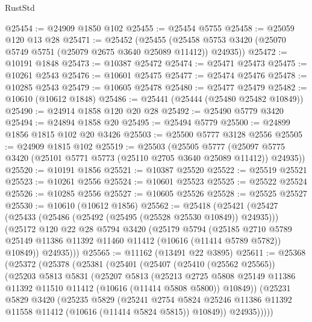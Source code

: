 \begin{lexlean}{RustStd}
\begin{coremodule}
@25454 := @24909 @1850 @102
@25455 := @25454 @5755
@25458 := @25059 @120 @13 @28
@25471 := @25452
    (@25455 (@25458 @5753 @3420 (@25070 @5749 @5751 (@25079 @2675 @3640 @25089 @11412)) @24935))
@25472 := @10191 @1848
@25473 := @10387 @25472
@25474 := @25471 @25473
@25475 := @10261 @2543
@25476 := @10601 @25475
@25477 := @25474 @25476
@25478 := @10285 @2543
@25479 := @10605 @25478
@25480 := @25477 @25479
@25482 := @10610 (@10612 @1848)
@25486 := @25441 (@25444 (@25480 @25482 @10849))
@25490 := @24914 @1858 @120 @20 @28
@25492 := @25490 @5779 @3420
@25494 := @24894 @1858 @20
@25495 := @25494 @5779
@25500 := @24899 @1856 @1815 @102 @20 @3426
@25503 := @25500 @5777 @3128 @2556
@25505 := @24909 @1815 @102
@25519 := @25503
    (@25505
      @5777
      (@25097 @5775 @3420 (@25101 @5771 @5773 (@25110 @2705 @3640 @25089 @11412)) @24935))
@25520 := @10191 @1856
@25521 := @10387 @25520
@25522 := @25519 @25521
@25523 := @10261 @2556
@25524 := @10601 @25523
@25525 := @25522 @25524
@25526 := @10285 @2556
@25527 := @10605 @25526
@25528 := @25525 @25527
@25530 := @10610 (@10612 @1856)
@25562 := @25418
    (@25421
      (@25427
        (@25433 (@25486 (@25492 (@25495 (@25528 @25530 @10849)) @24935)))
        (@25172
          @120
          @22
          @28
          @5794
          @3420
          (@25179
            @5794
            (@25185
              @2710
              @5789
              @25149
              @11386
              @11392
              @11460
              @11412
              (@10616 (@11414 @5789 @5782))
              @10849))
          @24935)))
@25565 := @11162 (@13491 @22 @3895)
@25611 := @25368
    (@25372
      (@25378
        (@25381
          (@25401
            (@25407
              (@25410 (@25562 @25565))
              (@25203
                @5813
                @5831
                (@25207
                  @5813
                  (@25213
                    @2725
                    @5808
                    @25149
                    @11386
                    @11392
                    @11510
                    @11412
                    (@10616 (@11414 @5808 @5800))
                    @10849))
                (@25231
                  @5829
                  @3420
                  (@25235
                    @5829
                    (@25241
                      @2754
                      @5824
                      @25246
                      @11386
                      @11392
                      @11558
                      @11412
                      (@10616 (@11414 @5824 @5815))
                      @10849))
                  @24935)))))

\end{coremodule}
\end{lexlean}
